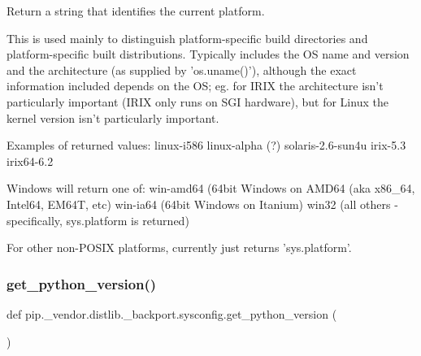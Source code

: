 \begin{DoxyVerb}Return a string that identifies the current platform.

This is used mainly to distinguish platform-specific build directories and
platform-specific built distributions.  Typically includes the OS name
and version and the architecture (as supplied by 'os.uname()'),
although the exact information included depends on the OS; eg. for IRIX
the architecture isn't particularly important (IRIX only runs on SGI
hardware), but for Linux the kernel version isn't particularly
important.

Examples of returned values:
   linux-i586
   linux-alpha (?)
   solaris-2.6-sun4u
   irix-5.3
   irix64-6.2

Windows will return one of:
   win-amd64 (64bit Windows on AMD64 (aka x86_64, Intel64, EM64T, etc)
   win-ia64 (64bit Windows on Itanium)
   win32 (all others - specifically, sys.platform is returned)

For other non-POSIX platforms, currently just returns 'sys.platform'.
\end{DoxyVerb}
 \mbox{\label{namespacepip_1_1__vendor_1_1distlib_1_1__backport_1_1sysconfig_ade2d7aba2fd68694224291a38fdbc828}} 
\subsubsection{\texorpdfstring{get\+\_\+python\+\_\+version()}{get\_python\_version()}}
{\footnotesize\ttfamily def pip.\+\_\+vendor.\+distlib.\+\_\+backport.\+sysconfig.\+get\+\_\+python\+\_\+version (\begin{DoxyParamCaption}{ }\end{DoxyParamCaption})}

\mbox{\label{namespacepip_1_1__vendor_1_1distlib_1_1__backport_1_1sysconfig_aa0220cfa78bdd6583651aaa56de76981}} 
